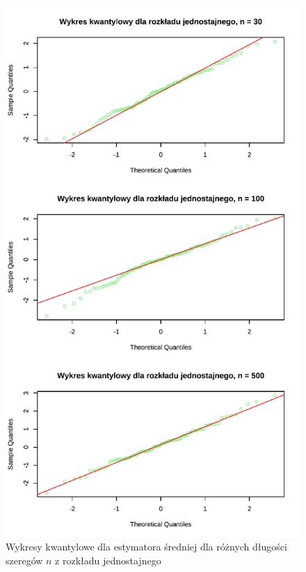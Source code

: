 \documentclass[10pt, a4paper]{article}\usepackage[]{graphicx}\usepackage[]{xcolor}
\makeatletter
\def\maxwidth{ %
  \ifdim\Gin@nat@width>\linewidth
    \linewidth
  \else
    \Gin@nat@width
  \fi
}
\newenvironment{knitrout}{}{} %
\makeatother
\begin{document}
\begin{knitrout}
\color{fgcolor}\begin{figure}[H]

{\centering \includegraphics[width=\maxwidth]{figure/analiza-srednie-unif-wykresy-kwant-1} 

}

\caption[Wykresy kwantylowe dla estymatora średniej dla różnych długości szeregów $n$ z rozkładu jednostajnego]{Wykresy kwantylowe dla estymatora średniej dla różnych długości szeregów $n$ z rozkładu jednostajnego}\label{fig:analiza-srednie-unif-wykresy-kwant}
\end{figure}

\end{knitrout}
\end{document}
